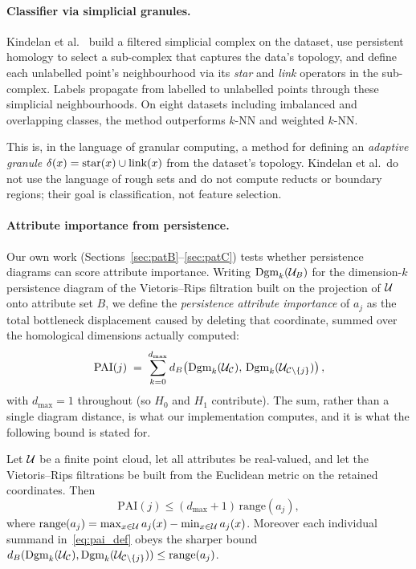 \paragraph{Classifier via simplicial granules.}
Kindelan et al.~\cite{Kindelan2021TDABC} build a filtered simplicial complex
on the dataset, use persistent homology to select a sub-complex that captures
the data's topology, and define each unlabelled point's neighbourhood via its
\emph{star} and \emph{link} operators in the sub-complex.  Labels propagate
from labelled to unlabelled points through these simplicial neighbourhoods.
On eight datasets including imbalanced and overlapping classes, the method
outperforms $k$-NN and weighted $k$-NN.

This is, in the language of granular computing, a method for defining an
\emph{adaptive granule} $\delta_{}(x) = \mathrm{star}(x) \cup \mathrm{link}(x)$
from the dataset's topology.  Kindelan et al.\ do not use the language of
rough sets and do not compute reducts or boundary regions; their goal is
classification, not feature selection.

\paragraph{Attribute importance from persistence.}
Our own work (Sections~\ref{sec:patB}--\ref{sec:patC}) tests whether
persistence diagrams can score attribute importance.  Writing
$\mathrm{Dgm}_k(\mathcal{U}_B)$ for the dimension-$k$ persistence diagram of the
Vietoris--Rips filtration built on the projection of $\mathcal{U}$ onto attribute
set $B$, we define the \emph{persistence attribute importance} of $a_j$ as
the total bottleneck displacement caused by deleting that coordinate,
summed over the homological dimensions actually computed:
\begin{equation}\label{eq:pai_def}
  \mathrm{PAI}(j) \;=\; \sum_{k=0}^{d_{\max}}
    d_B\!\left(\mathrm{Dgm}_k(\mathcal{U}_{\mathcal{C}}),\,
               \mathrm{Dgm}_k(\mathcal{U}_{\mathcal{C}\setminus\{j\}})\right),
\end{equation}
with $d_{\max}=1$ throughout (so $H_0$ and $H_1$ contribute).  The sum,
rather than a single diagram distance, is what our implementation computes,
and it is what the following bound is stated for.

\begin{theorem}
\label{thm:pai_bound}
Let $\mathcal{U}$ be a finite point cloud, let all attributes be real-valued, and let
the Vietoris--Rips filtrations be built from the Euclidean metric on the
retained coordinates.  Then
\begin{equation}\label{eq:pai_bound}
  \mathrm{PAI}(j) \leq (d_{\max}+1)\,\mathrm{range}(a_j),
\end{equation}
where $\mathrm{range}(a_j) = \max_{x\in\mathcal{U}} a_j(x) - \min_{x\in\mathcal{U}} a_j(x)$.
Moreover each individual summand in~\eqref{eq:pai_def} obeys the sharper
bound $d_B(\mathrm{Dgm}_k(\mathcal{U}_{\mathcal{C}}),\mathrm{Dgm}_k(\mathcal{U}_{\mathcal{C}\setminus\{j\}}))
\leq \mathrm{range}(a_j)$.
\end{theorem}

